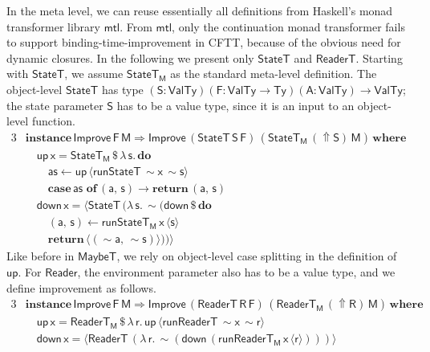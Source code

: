 \documentclass[acmsmall,screen,review,anonymous]{acmart}
\newcommand{\mit}[1]{{\mathsf{#1}}}
\newcommand{\msf}[1]{{\mathsf{#1}}}
\newcommand{\mbf}[1]{{\mathbf{#1}}}
\newcommand{\bs}[1]{\boldsymbol{#1}}
\newcommand{\mdo}{\mbf{do}\,}
\newcommand{\ind}{\hspace{1em}}
\newcommand{\return}{\mbf{return}\,}
\newcommand{\lam}{\lambda\,}
\newcommand{\where}{\mbf{where}}
\newcommand{\M}{\msf{M}}
\newcommand{\of}{\mbf{of}\,}
\newcommand{\vA}{\mathsf{A}}
\newcommand{\vS}{\mathsf{S}}
\newcommand{\vF}{\mathsf{F}}
\newcommand{\vR}{\mathsf{R}}
\newcommand{\vM}{\mathsf{M}}
\newcommand{\va}{\mathsf{a}}
\newcommand{\vx}{\mathsf{x}}
\newcommand{\vs}{\mathsf{s}}
\newcommand{\vr}{\mathsf{r}}
\newcommand{\Reader}{\msf{Reader}}
\newcommand{\ReaderT}{\msf{ReaderT}}
\newcommand{\fro}{\leftarrow}
\newcommand{\case}{\mbf{case\,}}
\newcommand{\Up}{{\Uparrow}}
\newcommand{\spl}{{\bs{\sim}}}
\newcommand{\ql}{{\bs{\langle}}}
\newcommand{\qr}{{\bs{\rangle}}}
\newcommand{\VTy}{\msf{ValTy}}
\newcommand{\Ty}{\msf{Ty}}
\newcommand{\MaybeT}{\msf{MaybeT}}
\theoremstyle{remark}
\newcommand{\mup}{\mit{up}}
\newcommand{\mdown}{\mit{down}}
\newcommand{\instance}{\mbf{instance}\,}
\newcommand{\Improve}{\msf{Improve}}
\newcommand{\qt}[1]{\ql#1\qr}
\newcommand{\RA}{\Rightarrow}
\newcommand{\StateT}{\msf{StateT}}
\newcommand{\runReaderT}{\mit{runReaderT}}
\newcommand{\runStateT}{\mit{runStateT}}
\newcommand{\dlr}{\,\$\,}
\begin{document}
In the meta level, we can reuse essentially all definitions from Haskell's monad
transformer library $\msf{mtl}$. From $\msf{mtl}$, only the continuation monad
transformer fails to support binding-time-improvement in CFTT, because of the
obvious need for dynamic closures. In the following we present only $\StateT$
and $\ReaderT$. Starting with $\StateT$, we assume $\StateT_\M$ as the standard
meta-level definition. The object-level $\StateT$ has type $(\vS : \VTy)(\vF : \VTy
\to \Ty)(\vA : \VTy) \to \VTy$; the state parameter $\vS$ has to be a value type,
since it is an input to an object-level function.
\begin{alignat*}{3}
  &\instance \Improve\,\vF\,\vM \RA \Improve\,(\StateT\,\vS\,\vF)\,(\StateT_\M\,(\Up \vS)\,\vM)\,\where\\
  &\ind \mup\,\vx = \StateT_\M \dlr \lam \vs.\,\mdo\\
  &\ind\ind \mit{as} \fro \mup\,\qt{\runStateT\,\spl \vx\,\spl \vs}\\
  &\ind\ind \case \mit{as}\,\,\of (\va,\,\vs) \to \return (\va,\,\vs)\\
  &\ind \mdown\,\vx = \qt{ \StateT\,(\lam \vs.\, \spl(\mdown \dlr \mdo\\\
  &\ind \ind (\va,\,\vs) \fro \runStateT_\M\,\vx\,\qt{\vs}\\
  &\ind \ind \return \qt{(\spl \va,\, \spl \vs)}))}
\end{alignat*}
Like before in $\MaybeT$, we rely on object-level case splitting in the
definition of $\mup$. For $\Reader$, the environment parameter also has to be a
value type, and we define improvement as follows.
\begin{alignat*}{3}
  &\instance \Improve\,\vF\,\vM \RA \Improve\,(\ReaderT\,\vR\,\vF)\,(\ReaderT_\M\,(\Up \vR)\,\vM)\,\where\\
  &\ind \mup\,\vx   = \ReaderT_\M \dlr \lam \vr.\, \mup\,\qt{\runReaderT\,\spl \vx\,\spl \vr}\\
  &\ind \mdown\,\vx = \qt{\ReaderT\,(\lam \vr.\,\spl(\mdown\,(\runReaderT_\M\,\vx\,\qt{\vr})))}
\end{alignat*}
\end{document}
